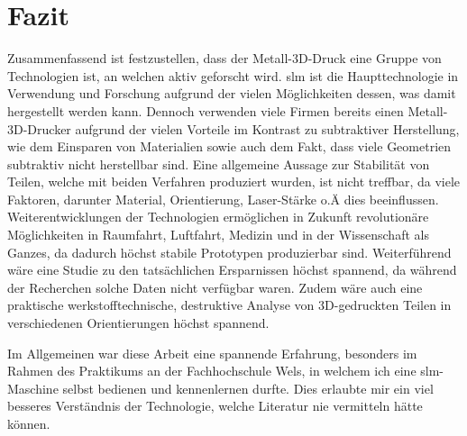 \documentclass[../main.tex]{subfiles}
\begin{document}
\section{Fazit}
Zusammenfassend ist festzustellen, dass der Metall-3D-Druck eine Gruppe von Technologien ist, an welchen aktiv geforscht wird. \acrshort{slm} ist die Haupttechnologie in Verwendung und Forschung aufgrund der vielen Möglichkeiten dessen, was damit hergestellt werden kann.
Dennoch verwenden viele Firmen bereits einen Metall-3D-Drucker aufgrund der vielen Vorteile im Kontrast zu subtraktiver Herstellung, wie dem Einsparen von Materialien sowie auch dem Fakt, dass viele Geometrien subtraktiv nicht herstellbar sind. 
Eine allgemeine Aussage zur Stabilität von Teilen, welche mit beiden Verfahren produziert wurden, ist nicht treffbar, da viele Faktoren, darunter Material, Orientierung, Laser-Stärke o.Ä dies beeinflussen.  
Weiterentwicklungen der Technologien ermöglichen in Zukunft revolutionäre Möglichkeiten in Raumfahrt, Luftfahrt, Medizin und in der Wissenschaft als Ganzes, da dadurch höchst stabile Prototypen produzierbar sind.\parencite{Singh2020} 
Weiterführend wäre eine Studie zu den tatsächlichen Ersparnissen höchst spannend, da während der Recherchen solche Daten nicht verfügbar waren. Zudem wäre auch eine praktische werkstofftechnische, destruktive Analyse von 3D-gedruckten Teilen in verschiedenen Orientierungen höchst spannend.

Im Allgemeinen war diese Arbeit eine spannende Erfahrung, besonders im Rahmen des Praktikums an der Fachhochschule Wels, in welchem ich eine \acrshort{slm}-Maschine selbst bedienen und kennenlernen durfte. Dies erlaubte mir ein viel besseres Verständnis der Technologie, welche Literatur nie vermitteln hätte können.
\end{document}
